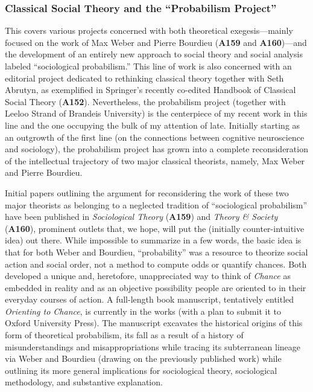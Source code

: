 \documentclass[a4paper,11pt]{extarticle}
\begin{document}
\subsubsection*{Classical Social Theory and the ``Probabilism Project''}
This covers various projects concerned with both theoretical exegesis---mainly focused on the work of Max Weber and Pierre Bourdieu (\textbf{A159} and \textbf{A160})---and the development of an entirely new approach to social theory and social analysis labeled ``sociological probabilism.'' This line of work is also concerned with an editorial project dedicated to rethinking classical theory together with Seth Abrutyn, as exemplified in Springer's recently co-edited Handbook of Classical Social Theory (\textbf{A152}). Nevertheless, the probabilism project (together with Leeloo Strand of Brandeis University) is the centerpiece of my recent work in this line and the one occupying the bulk of my attention of late. Initially starting as an outgrowth of the first line (on the connections between cognitive neuroscience and sociology), the probabilism project has grown into a complete reconsideration of the intellectual trajectory of two major classical theorists, namely, Max Weber and Pierre Bourdieu. 

Initial papers outlining the argument for reconsidering the work of these two major theorists as belonging to a neglected tradition of ``sociological probabilism'' have been published in \textit{Sociological Theory} (\textbf{A159}) and \textit{Theory \& Society} (\textbf{A160}), prominent outlets that, we hope, will put the (initially counter-intuitive idea) out there. While impossible to summarize in a few words, the basic idea is that for both Weber and Bourdieu, ``probability'' was a resource to theorize social action and social order, not a method to compute odds or quantify chances. Both developed a unique and, heretofore, unappreciated way to think of \textit{Chance} as embedded in reality and as an objective possibility people are oriented to in their everyday courses of action. A full-length book manuscript, tentatively entitled \textit{Orienting to Chance}, is currently in the works (with a plan to submit it to Oxford University Press). The manuscript excavates the historical origins of this form of theoretical probabilism, its fall as a result of a history of misunderstandings and misappropriations while tracing its subterranean lineage via Weber and Bourdieu (drawing on the previously published work) while outlining its more general implications for sociological theory, sociological methodology, and substantive explanation. 
\end{document}
